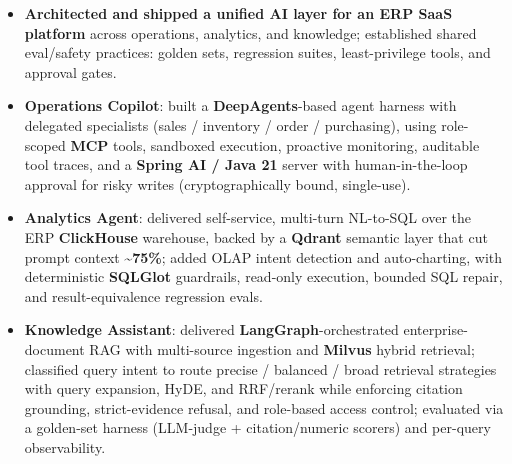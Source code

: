 \documentclass{resume}
\begin{document}
\begin{itemize}
  \item \textbf{Architected and shipped a unified AI layer for an ERP SaaS platform} across operations, analytics, and knowledge; established shared eval/safety practices: golden sets, regression suites, least-privilege tools, and approval gates.
  \item \textbf{Operations Copilot}: built a \textbf{DeepAgents}-based agent harness with delegated specialists (sales / inventory / order / purchasing), using role-scoped \textbf{MCP} tools, sandboxed execution, proactive monitoring, auditable tool traces, and a \textbf{Spring AI / Java 21} server with human-in-the-loop approval for risky writes (cryptographically bound, single-use).
  \item \textbf{Analytics Agent}: delivered self-service, multi-turn NL-to-SQL over the ERP \textbf{ClickHouse} warehouse, backed by a \textbf{Qdrant} semantic layer that cut prompt context \textbf{\textasciitilde75\%}; added OLAP intent detection and auto-charting, with deterministic \textbf{SQLGlot} guardrails, read-only execution, bounded SQL repair, and result-equivalence regression evals.
  \item \textbf{Knowledge Assistant}: delivered \textbf{LangGraph}-orchestrated enterprise-document RAG with multi-source ingestion and \textbf{Milvus} hybrid retrieval; classified query intent to route precise / balanced / broad retrieval strategies with query expansion, HyDE, and RRF/rerank while enforcing citation grounding, strict-evidence refusal, and role-based access control; evaluated via a golden-set harness (LLM-judge + citation/numeric scorers) and per-query observability.
\end{itemize}
\end{document}
